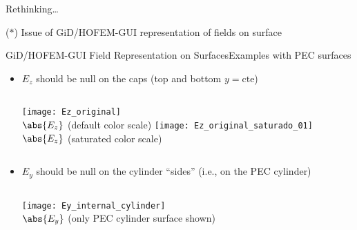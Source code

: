 \begin{frame}[plain]
  \centering    \Large{Rethinking\ldots}
  
  {\footnotesize \alert{($\ast$)} Issue of GiD/HOFEM-GUI representation of fields on surface}
  
\end{frame}

  
\begin{frame}[allowframebreaks]{GiD/HOFEM-GUI Field Representation 
    on Surfaces}{Examples with PEC surfaces}

  \begin{itemize}
  \item $E_z$ should be null on the  caps (top and
    bottom $y=\text{cte}$)

    \vbs
   
    \begin{columns}%
      \centering
      \centering
      \texttt{[image: Ez\_original]} \\
      \footnotesize{$\abs{E_z}$ (default color scale)}
      \centering
      \texttt{[image: Ez\_original\_saturado\_01]} \\
      \footnotesize{$\abs{E_z}$ (saturated color scale)}
    \end{columns}
    

    \framebreak %

  \item $E_y$ should be null on the cylinder ``sides'' (i.e., on the
    PEC cylinder)

    \vbss
   
    \begin{center}
     \begin{columns}%
      \centering
      \texttt{[image: Ey\_internal\_cylinder]} \\
      \footnotesize{$\abs{E_y}$ (only PEC cylinder surface shown)}
    \end{columns}
  \end{center}
  \end{itemize}
\end{frame}


